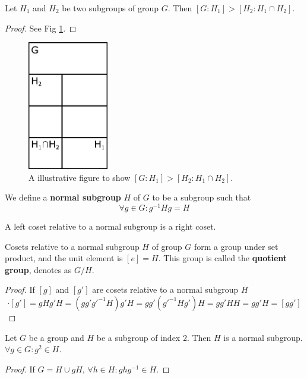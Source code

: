 \documentclass[12pt]{book}
\begin{document}
	\begin{lemma}
		Let $H_1$ and $H_2$ be two subgroups of group $G$. Then $[G:H_1]>[H_2:H_1\cap H_2]$.
	\end{lemma}
	\begin{proof}
		See Fig \ref{fig:coset}.
	\end{proof}
	\begin{figure}[htb!]
		\centering  
		\includegraphics[width=100pt]{resources/figures/1_coset.eps}
		\caption{A illustrative figure to show $[G:H_1]>[H_2:H_1\cap H_2]$.}
		\label{fig:coset} 
	\end{figure}
	
	\begin{definition}
		We define a\textbf{ normal subgroup} $H$ of $G$ to be a subgroup such that
	\begin{equation}
		\forall g\in G:g^{-1}Hg=H
	\end{equation}
	\end{definition}
	
\begin{lemma}
	A left coset relative to a normal subgroup is a right coset.
\end{lemma}
	
	\begin{theorem}
		Cosets relative to a normal subgroup $H$ of group $G$ form a group under set product, and the unit element is $[e]=H$. This group is called the \textbf{quotient group}, denotes as $G/H$.
	\end{theorem}
	\begin{proof}
		If $[g]$ and $[g']$ are cosets relative to a normal subgroup $H$
	\begin{equation}
		[g]\cdot[g']=gHg'H=(gg'g'^{-1}H)g'H=gg'(g'^{-1}Hg')H=gg'HH=gg'H=[gg']
	\end{equation}
	\end{proof}
	
	\begin{theorem}
		Let $G$ be a group and $H$ be a subgroup of index 2. Then $H$ is a normal subgroup. $\forall g\in G:g^2\in H$.
	\end{theorem}
	\begin{proof}
		If $G=H\cup gH$, $\forall h\in H: ghg^{-1}\in H$.
	\end{proof}
	
\end{document}
